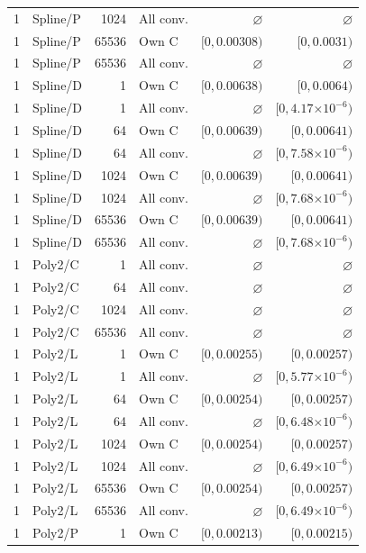 \begin{longtable}{llrlrr}
1 & Spline/P & 1024 & All conv. & $\varnothing$ & $\varnothing$ \\
1 & Spline/P & 65536 & Own C & $[0, 0.00308)$ & $[0, 0.0031)$ \\
1 & Spline/P & 65536 & All conv. & $\varnothing$ & $\varnothing$ \\
1 & Spline/D & 1 & Own C & $[0, 0.00638)$ & $[0, 0.0064)$ \\
1 & Spline/D & 1 & All conv. & $\varnothing$ & $[0, 4.17\mathord{\times}10^{-6})$ \\
1 & Spline/D & 64 & Own C & $[0, 0.00639)$ & $[0, 0.00641)$ \\
1 & Spline/D & 64 & All conv. & $\varnothing$ & $[0, 7.58\mathord{\times}10^{-6})$ \\
1 & Spline/D & 1024 & Own C & $[0, 0.00639)$ & $[0, 0.00641)$ \\
1 & Spline/D & 1024 & All conv. & $\varnothing$ & $[0, 7.68\mathord{\times}10^{-6})$ \\
1 & Spline/D & 65536 & Own C & $[0, 0.00639)$ & $[0, 0.00641)$ \\
1 & Spline/D & 65536 & All conv. & $\varnothing$ & $[0, 7.68\mathord{\times}10^{-6})$ \\
1 & Poly2/C & 1 & All conv. & $\varnothing$ & $\varnothing$ \\
1 & Poly2/C & 64 & All conv. & $\varnothing$ & $\varnothing$ \\
1 & Poly2/C & 1024 & All conv. & $\varnothing$ & $\varnothing$ \\
1 & Poly2/C & 65536 & All conv. & $\varnothing$ & $\varnothing$ \\
1 & Poly2/L & 1 & Own C & $[0, 0.00255)$ & $[0, 0.00257)$ \\
1 & Poly2/L & 1 & All conv. & $\varnothing$ & $[0, 5.77\mathord{\times}10^{-6})$ \\
1 & Poly2/L & 64 & Own C & $[0, 0.00254)$ & $[0, 0.00257)$ \\
1 & Poly2/L & 64 & All conv. & $\varnothing$ & $[0, 6.48\mathord{\times}10^{-6})$ \\
1 & Poly2/L & 1024 & Own C & $[0, 0.00254)$ & $[0, 0.00257)$ \\
1 & Poly2/L & 1024 & All conv. & $\varnothing$ & $[0, 6.49\mathord{\times}10^{-6})$ \\
1 & Poly2/L & 65536 & Own C & $[0, 0.00254)$ & $[0, 0.00257)$ \\
1 & Poly2/L & 65536 & All conv. & $\varnothing$ & $[0, 6.49\mathord{\times}10^{-6})$ \\
1 & Poly2/P & 1 & Own C & $[0, 0.00213)$ & $[0, 0.00215)$ \\

\end{longtable}
